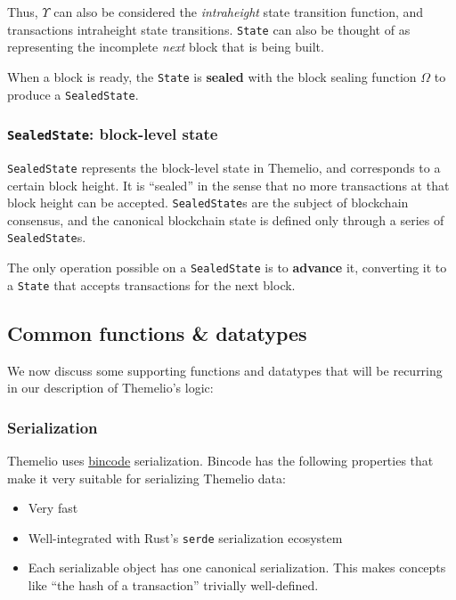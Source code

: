 \documentclass[
]{article}
\newcommand{\passthrough}[1]{#1}
\providecommand{\tightlist}{%
  \setlength{\itemsep}{0pt}\setlength{\parskip}{0pt}}
\begin{document}
Thus, \(\Upsilon\) can also be considered the \emph{intraheight} state
transition function, and transactions intraheight state transitions.
\passthrough{\lstinline!State!} can also be thought of as representing
the incomplete \emph{next} block that is being built.

When a block is ready, the \passthrough{\lstinline!State!} is
\textbf{sealed} with the block sealing function \(\Omega\) to produce a
\passthrough{\lstinline!SealedState!}.

\hypertarget{sealedstate-block-level-state}{%
  \subsubsection{\texorpdfstring{\texttt{SealedState}: block-level
      state}{SealedState: block-level state}}\label{sealedstate-block-level-state}}

\passthrough{\lstinline!SealedState!} represents the block-level state
in Themelio, and corresponds to a certain block height. It is ``sealed''
in the sense that no more transactions at that block height can be
accepted. \passthrough{\lstinline!SealedState!}s are the subject of
blockchain consensus, and the canonical blockchain state is defined only
through a series of \passthrough{\lstinline!SealedState!}s.

The only operation possible on a \passthrough{\lstinline!SealedState!}
is to \textbf{advance} it, converting it to a
\passthrough{\lstinline!State!} that accepts transactions for the next
block.

\hypertarget{common-functions-datatypes}{%
  \subsection{Common functions \&
    datatypes}\label{common-functions-datatypes}}

We now discuss some supporting functions and datatypes that will be
recurring in our description of Themelio's logic:

\hypertarget{serialization}{%
  \subsubsection{Serialization}\label{serialization}}

Themelio uses \href{https://crates.io/crates/bincode}{bincode}
serialization. Bincode has the following properties that make it very
suitable for serializing Themelio data:

\begin{itemize}
  \tightlist
  \item
        Very fast
  \item
        Well-integrated with Rust's \passthrough{\lstinline!serde!}
        serialization ecosystem
  \item
        Each serializable object has one canonical serialization. This makes
        concepts like ``the hash of a transaction'' trivially well-defined.
\end{itemize}
\end{document}
